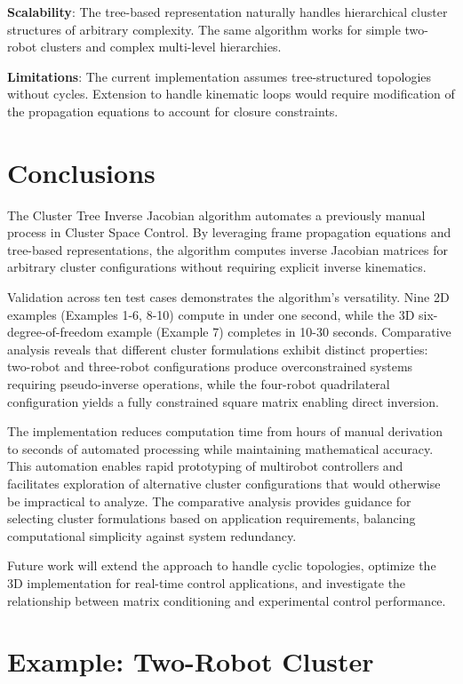 \documentclass[lettersize,journal]{IEEEtran}
\begin{document}
\textbf{Scalability}: The tree-based representation naturally handles hierarchical cluster structures of arbitrary complexity. The same algorithm works for simple two-robot clusters and complex multi-level hierarchies.

\textbf{Limitations}: The current implementation assumes tree-structured topologies without cycles. Extension to handle kinematic loops would require modification of the propagation equations to account for closure constraints.

\section{Conclusions}

The Cluster Tree Inverse Jacobian algorithm automates a previously manual process in Cluster Space Control. By leveraging frame propagation equations and tree-based representations, the algorithm computes inverse Jacobian matrices for arbitrary cluster configurations without requiring explicit inverse kinematics.

Validation across ten test cases demonstrates the algorithm's versatility. Nine 2D examples (Examples 1-6, 8-10) compute in under one second, while the 3D six-degree-of-freedom example (Example 7) completes in 10-30 seconds. Comparative analysis reveals that different cluster formulations exhibit distinct properties: two-robot and three-robot configurations produce overconstrained systems requiring pseudo-inverse operations, while the four-robot quadrilateral configuration yields a fully constrained square matrix enabling direct inversion.

The implementation reduces computation time from hours of manual derivation to seconds of automated processing while maintaining mathematical accuracy. This automation enables rapid prototyping of multirobot controllers and facilitates exploration of alternative cluster configurations that would otherwise be impractical to analyze. The comparative analysis provides guidance for selecting cluster formulations based on application requirements, balancing computational simplicity against system redundancy.

Future work will extend the approach to handle cyclic topologies, optimize the 3D implementation for real-time control applications, and investigate the relationship between matrix conditioning and experimental control performance.

\appendix

\section{Example: Two-Robot Cluster}
\end{document}
